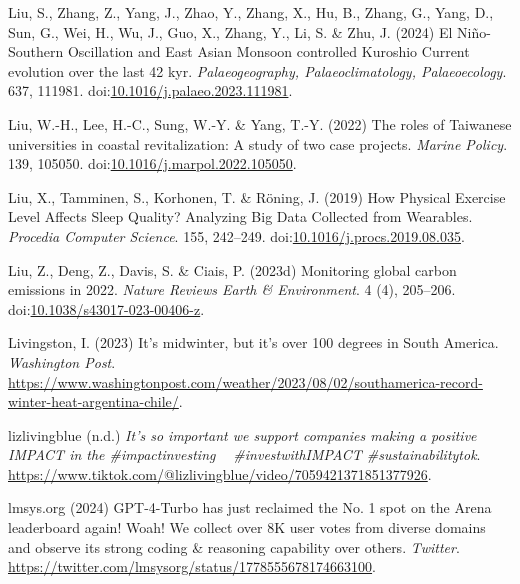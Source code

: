 \documentclass[
  letterpaper,
  DIV=11,
  numbers=noendperiod]{scrartcl}
\newlength{\cslhangindent}
\newenvironment{CSLReferences}[2] %
 {\begin{list}{}{%
  \setlength{\itemindent}{0pt}
  \setlength{\leftmargin}{0pt}
  \setlength{\parsep}{0pt}
  \ifodd #1
   \setlength{\leftmargin}{\cslhangindent}
   \setlength{\itemindent}{-1\cslhangindent}
  \fi
  \setlength{\itemsep}{#2\baselineskip}}}
 {\end{list}}
\begin{document}
\begin{CSLReferences}{0}{1}
Liu, S., Zhang, Z., Yang, J., Zhao, Y., Zhang, X., Hu, B., Zhang, G.,
Yang, D., Sun, G., Wei, H., Wu, J., Guo, X., Zhang, Y., Li, S. \& Zhu,
J. (2024) El {Ni{ñ}o-Southern Oscillation} and {East Asian Monsoon}
controlled {Kuroshio Current} evolution over the last 42 kyr.
\emph{Palaeogeography, Palaeoclimatology, Palaeoecology}. 637, 111981.
doi:\href{https://doi.org/10.1016/j.palaeo.2023.111981}{10.1016/j.palaeo.2023.111981}.

Liu, W.-H., Lee, H.-C., Sung, W.-Y. \& Yang, T.-Y. (2022) The roles of
{Taiwanese} universities in coastal revitalization: {A} study of two
case projects. \emph{Marine Policy}. 139, 105050.
doi:\href{https://doi.org/10.1016/j.marpol.2022.105050}{10.1016/j.marpol.2022.105050}.

Liu, X., Tamminen, S., Korhonen, T. \& Röning, J. (2019) How {Physical
Exercise Level Affects Sleep Quality}? {Analyzing Big Data Collected}
from {Wearables}. \emph{Procedia Computer Science}. 155, 242--249.
doi:\href{https://doi.org/10.1016/j.procs.2019.08.035}{10.1016/j.procs.2019.08.035}.

Liu, Z., Deng, Z., Davis, S. \& Ciais, P. (2023d) Monitoring global
carbon emissions in 2022. \emph{Nature Reviews Earth \& Environment}. 4
(4), 205--206.
doi:\href{https://doi.org/10.1038/s43017-023-00406-z}{10.1038/s43017-023-00406-z}.

Livingston, I. (2023) It's midwinter, but it's over 100 degrees in
{South America}. \emph{Washington Post}.
\url{https://www.washingtonpost.com/weather/2023/08/02/southamerica-record-winter-heat-argentina-chile/}.

lizlivingblue (n.d.) \emph{It's so important we support companies making
a positive {IMPACT} in the \#impactinvesting 💚💸 \#{investwithIMPACT}
\#sustainabilitytok}.
\url{https://www.tiktok.com/@lizlivingblue/video/7059421371851377926}.

lmsys.org (2024) {GPT-4-Turbo} has just reclaimed the {No}. 1 spot on
the {Arena} leaderboard again! {Woah}! {We} collect over {8K} user votes
from diverse domains and observe its strong coding \& reasoning
capability over others. \emph{Twitter}.
\url{https://twitter.com/lmsysorg/status/1778555678174663100}.


\end{CSLReferences}
\end{document}
